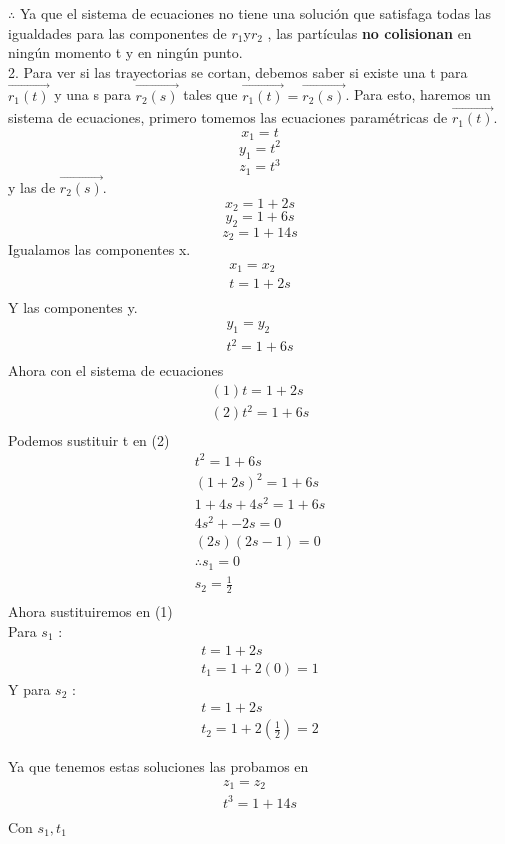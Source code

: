 \documentclass[12pt]{article}
\begin{document}
$ \therefore $ Ya que el sistema de ecuaciones no tiene una solución que satisfaga todas las igualdades para las componentes de $r_1 $y$ r_2$ , las partículas \textbf{no colisionan} en ningún momento t y en ningún punto.\\

 2. Para ver si las trayectorias se cortan, debemos saber si existe una t para $\vec{r_1(t)}$ y una s para $\vec{r_2(s)}$ tales que $\vec{r_1(t)} = \vec{r_2(s)}$.
 Para esto, haremos un sistema de ecuaciones, primero tomemos las ecuaciones paramétricas de $\vec{r_1(t)}$.
 \[ x_1 = t\]
\[ y_1 = t^2\]
\[ z_1 = t^3\]
y las de $\vec{r_2(s)}$.
\[ x_2 = 1+2s\]
\[ y_2 = 1+6s\]
\[ z_2 = 1+14s\]
Igualamos las componentes x.
\begin{align*}
   x_1 = x_2 \\
   t =  1+2s \\
\end{align*}
Y las componentes y.
\begin{align*}
   y_1 = y_2 \\
   t^2 =  1+6s \\
\end{align*}
Ahora con el sistema de ecuaciones
\begin{align*}
   (1) t =  1+2s \\
   (2) t^2 =  1+6s \\
\end{align*}
Podemos sustituir t en (2)
\begin{align*}
   t^2 =  1+6s \\
   (1+2s)^2= 1+6s \\
   1+4s+4s^2 = 1 + 6s \\
   4s^2 + -2s = 0 \\
   (2s)(2s-1) = 0 \\
   \therefore s_1 = 0 \\
   s_2 = \frac{1}{2} \\
\end{align*}
Ahora sustituiremos en (1)
\\
Para $s_1$ :
\begin{align*}
    t =  1+2s \\
   t_1 = 1 + 2 (0) = 1
\end{align*}
Y para $s_2$ :
\begin{align*}
    t =  1+2s \\
   t_2 = 1 + 2 \left(\frac{1}{2} \right) = 2
\end{align*}

Ya que tenemos estas soluciones las probamos en 
\begin{align*}
   z_1 = z_2 \\
   t^3 =  1+14s \\
\end{align*}
Con $s_1, t_1$
\end{document}
